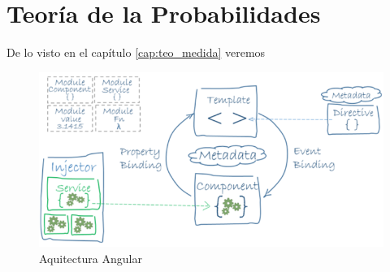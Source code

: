 \chapter{Teoría de la Probabilidades} \label{cap:teo_prob}
	\lipsum[5] \lipsum[4]
	
	De lo visto en el capítulo \ref{cap:teo_medida} veremos \lipsum[1]
	
	\begin{figure}[h]
		\centering
		\includegraphics[scale=0.5]{imagenes/arqui_angular.png}
		\caption{Aquitectura Angular}
		\label{fig:imgen_1}
	\end{figure}